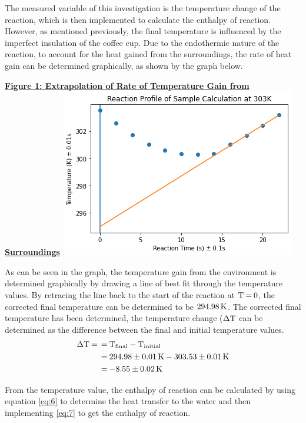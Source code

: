 \documentclass{article}
\begin{document}
\noindent
The measured variable of this investigation is the temperature change of the reaction, which is then implemented to calculate the enthalpy of reaction. However, as mentioned previously, the final temperature is influenced by the imperfect insulation of the coffee cup. Due to the endothermic nature of the reaction, to account for the heat gained from the surroundings, the rate of heat gain can be determined graphically, as shown by the graph below.

\begin{center}
\textbf{\underline{Figure 1: Extrapolation of Rate of Temperature Gain from Surroundings}}
\includegraphics{SampleCalculation.png}    
\end{center}


\noindent
As can be seen in the graph, the temperature gain from the environment is determined graphically by drawing a line of best fit through the temperature values. By retracing the line back to the start of the reaction at $\ce{T = 0}$, the corrected final temperature can be determined to be $\ce{294.98K}$. The corrected final temperature has been determined, the temperature change ($\ce{\Delta T}$ can be determined as the difference between the final and initial temperature values.
\begin{equation}
    \begin{split}
        \ce{
        \Delta T = &= T_{final} - T_{initial} \\
        &= 294.98 \pm 0.01 K - 303.53 \pm 0.01 K \\
        &= -8.55 \pm 0.02 K
        }
    \end{split}
\end{equation}

\noindent
From the temperature value, the enthalpy of reaction can be calculated by using equation \ref{eq:6} to determine the heat transfer to the water and then implementing \ref{eq:7} to get the enthalpy of reaction.
\end{document}
